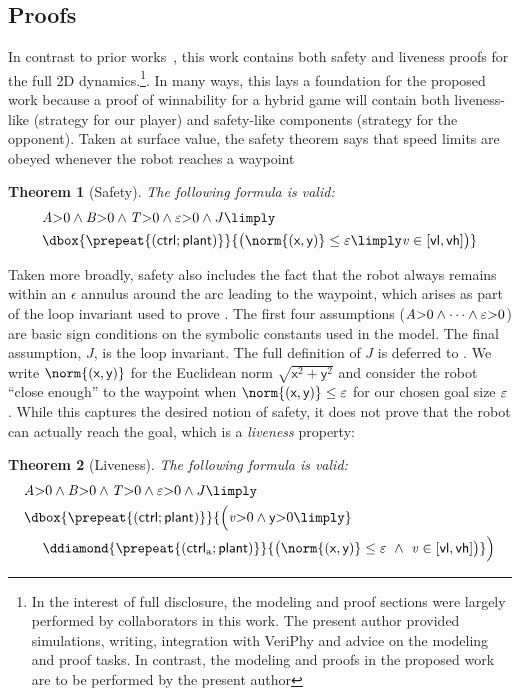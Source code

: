 \documentclass[12pt]{cmuthesis}
\newtheorem{theorem}{Theorem}
\theoremstyle{definition}
\theoremstyle{remark}
\newcommand{\xgvar}{\textsf{x}}
\newcommand{\ygvar}{\textsf{y}}
\newcommand{\yvar}{\textsf{y}}
\newcommand{\vlvar}{\textsf{vl}}
\newcommand{\vhvar}{\textsf{vh}}
\newcommand{\ctrl}{\textsf{ctrl}\xspace}
\newcommand{\ctrlliv}{\ctrl_{\text{a}}}
\newcommand{\plant}{\textsf{plant}\xspace}
\newcommand{\enorm}[1]{\norm{#1}}
\newcommand{\linv}{J}
\newcommand{\rref}[2][]{\prettyref{#2}}
\newcommand{\VeriPhy}{VeriPhy\xspace}
\begin{document}
\subsection{Proofs}
In contrast to prior works~\cite{DBLP:journals/ijrr/MitschGVP17}, this work contains both safety and liveness proofs for the full 2D dynamics.\footnote{In the interest of full disclosure, the modeling and proof sections were largely performed by collaborators in this work. The present author provided simulations, writing, integration with \VeriPhy and advice on the modeling and proof tasks. In contrast, the modeling and proofs in the proposed work are to be performed by the present author}.
In many ways, this lays a foundation for the proposed work because a proof of winnability for a hybrid game will contain both liveness-like (strategy for our player) and safety-like components (strategy for the opponent).
Taken at surface value, the safety theorem says that speed limits are obeyed whenever the robot reaches a waypoint
\begin{theorem}[Safety]
\label{thm:safe}
The following \dL formula is valid:
\begin{align*}
&\Avar{>}0 \land \Bvar{>}0 \land \Tvar{>}0 \land \veps{>}0 \land \linv \limply \\
&\dbox{\prepeat{(\ctrl;\plant)}}{\big(\enorm{(\xgvar,\ygvar)} \leq \veps \limply \vvar \in [\vlvar,\vhvar]\big)}
\end{align*}
\end{theorem}
Taken more broadly, safety also includes the fact that the robot always remains within an $\epsilon$ annulus around the arc leading to the waypoint, which arises as part of the loop invariant used to prove \rref{thm:safe}.
The first four assumptions (${\it A}{>}0 \land \dots \land \varepsilon{>}0$) are basic sign conditions on the symbolic constants used in the model. 
The final assumption, $\linv$, is the loop invariant.
The full definition of $\linv$ is deferred to \rref{sec:robostage}.
We write $\enorm{(\xgvar,\ygvar)}$ for the Euclidean norm $\sqrt{\xgvar^2 + \ygvar^2}$ and consider the robot ``close enough'' to the waypoint when $\enorm{(\xgvar,\ygvar)} \leq \veps$ for our chosen goal size $\varepsilon$.
While this captures the desired notion of safety, it does not prove that the robot can actually reach the goal, which is a \emph{liveness} property:
\begin{theorem}[Liveness]
\label{thm:liveness}
The following \dL formula is valid:
\begin{align*}
&\Avar{>}0 \land \Bvar{>}0 \land \Tvar{>}0 \land \veps{>}0 \land \linv \limply \\
&\dbox{\prepeat{(\ctrl;\plant)}}{\Big( \vvar{>}0 \land \yvar{>}0 \limply }\\
&\ \ \ \ \ddiamond{\prepeat{(\ctrlliv;\plant)}}{\big(\enorm{(\xgvar,\ygvar)} \leq \veps~\land~\vvar \in [\vlvar,\vhvar]\big)} \Big)
\end{align*}
\end{theorem}
\end{document}
